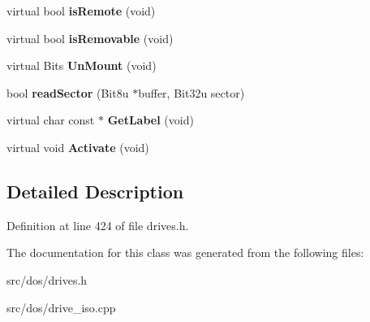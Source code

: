 \begin{DoxyCompactItemize}
\item 
\hypertarget{classisoDrive_a3bf3c53009a3bd8ca3fe822d9ff2487d}{virtual bool {\bfseries is\-Remote} (void)}\label{classisoDrive_a3bf3c53009a3bd8ca3fe822d9ff2487d}

\item 
\hypertarget{classisoDrive_ab3a5c7695c171b7132ee2b8d08ebcd64}{virtual bool {\bfseries is\-Removable} (void)}\label{classisoDrive_ab3a5c7695c171b7132ee2b8d08ebcd64}

\item 
\hypertarget{classisoDrive_ad58ab0d475eec136f5738b4ac8d33136}{virtual Bits {\bfseries Un\-Mount} (void)}\label{classisoDrive_ad58ab0d475eec136f5738b4ac8d33136}

\item 
\hypertarget{classisoDrive_a4e6ef7d78f8bc93437a216f1b88b3d43}{bool {\bfseries read\-Sector} (Bit8u $\ast$buffer, Bit32u sector)}\label{classisoDrive_a4e6ef7d78f8bc93437a216f1b88b3d43}

\item 
\hypertarget{classisoDrive_acf1acbf5887b1d557589ea6eb1301a07}{virtual char const $\ast$ {\bfseries Get\-Label} (void)}\label{classisoDrive_acf1acbf5887b1d557589ea6eb1301a07}

\item 
\hypertarget{classisoDrive_a13b831240141955fb769a1d7b3dca700}{virtual void {\bfseries Activate} (void)}\label{classisoDrive_a13b831240141955fb769a1d7b3dca700}

\end{DoxyCompactItemize}


\subsection{Detailed Description}


Definition at line 424 of file drives.\-h.



The documentation for this class was generated from the following files\-:\begin{DoxyCompactItemize}
\item 
src/dos/drives.\-h\item 
src/dos/drive\-\_\-iso.\-cpp\end{DoxyCompactItemize}
